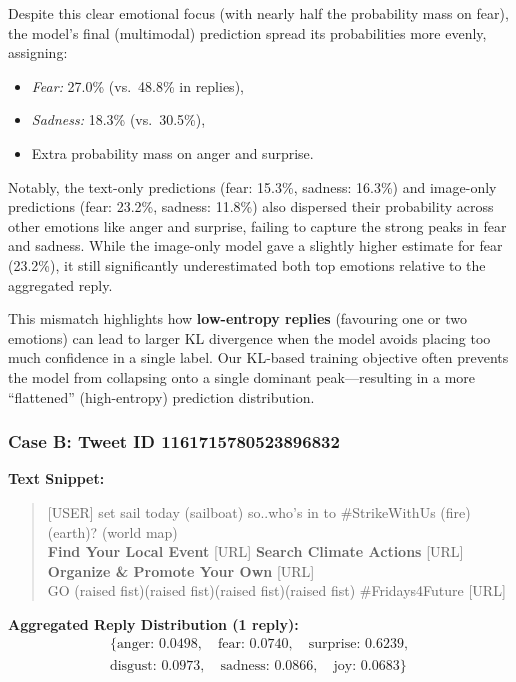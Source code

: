 Despite this clear emotional focus (with nearly half the probability mass on fear), the model’s final (multimodal) prediction spread its probabilities more evenly, assigning:

\begin{itemize}
    \item \textit{Fear:} 27.0\% (vs.\ 48.8\% in replies),
    \item \textit{Sadness:} 18.3\% (vs.\ 30.5\%),
    \item Extra probability mass on anger and surprise.
\end{itemize}

Notably, the text-only predictions (fear: 15.3\%, sadness: 16.3\%) and image-only predictions (fear: 23.2\%, sadness: 11.8\%) also dispersed their probability across other emotions like anger and surprise, failing to capture the strong peaks in fear and sadness. While the image-only model gave a slightly higher estimate for fear (23.2\%), it still significantly underestimated both top emotions relative to the aggregated reply.
\newline

This mismatch highlights how \textbf{low-entropy replies} (favouring one or two emotions) can lead to larger KL divergence when the model avoids placing too much confidence in a single label. Our KL-based training objective often prevents the model from collapsing onto a single dominant peak—resulting in a more ``flattened” (high-entropy) prediction distribution.

\subsubsection*{Case B: Tweet ID 1161715780523896832}

\noindent\textbf{Text Snippet:}
\begin{quote}
[USER] set sail today (sailboat) so..who’s in to \#StrikeWithUs (fire)(earth)? (world map) \\
\textbf{Find Your Local Event} [URL] \quad
\textbf{Search Climate Actions} [URL] \quad
\textbf{Organize \& Promote Your Own} [URL] \\
GO (raised fist)(raised fist)(raised fist)(raised fist) \#Fridays4Future [URL]
\end{quote}

\noindent\textbf{Aggregated Reply Distribution (1 reply):}
\[
\begin{aligned}
\{\text{anger: } 0.0498, \quad \text{fear: } 0.0740, \quad \text{surprise: } 0.6239, \\
\text{disgust: } 0.0973, \quad \text{sadness: } 0.0866, \quad \text{joy: } 0.0683\}
\end{aligned}
\]


